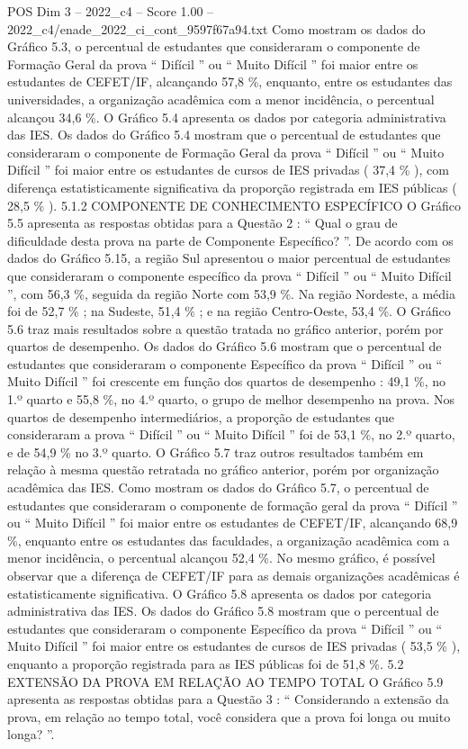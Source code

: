 \begin{textsample}{POS Dim 3 – 2022\_c4 – Score 1.00 – 2022\_c4/enade\_2022\_ci\_cont\_9597f67a94.txt}
Como mostram os dados do Gráfico 5.3, o percentual de estudantes que consideraram o componente de Formação Geral da prova “ Difícil ” ou “ Muito Difícil ” foi maior entre os estudantes de CEFET/IF, alcançando 57,8 \%, enquanto, entre os estudantes das universidades, a organização acadêmica com a menor incidência, o percentual alcançou 34,6 \%.
O Gráfico 5.4 apresenta os dados por categoria administrativa das IES.
Os dados do Gráfico 5.4 mostram que o percentual de estudantes que consideraram o componente de Formação Geral da prova “ Difícil ” ou “ Muito Difícil ” foi maior entre os estudantes de cursos de IES privadas ( 37,4 \% ), com diferença estatisticamente significativa da proporção registrada em IES públicas ( 28,5 \% ). 5.1.2 COMPONENTE DE CONHECIMENTO ESPECÍFICO O Gráfico 5.5 apresenta as respostas obtidas para a Questão 2 : “ Qual o grau de dificuldade desta prova na parte de Componente Específico? ”.
De acordo com os dados do Gráfico 5.15, a região Sul apresentou o maior percentual de estudantes que consideraram o componente específico da prova “ Difícil ” ou “ Muito Difícil ”, com 56,3 \%, seguida da região Norte com 53,9 \%.
Na região Nordeste, a média foi de 52,7 \% ; na Sudeste, 51,4 \% ; e na região Centro-Oeste, 53,4 \%.
O Gráfico 5.6 traz mais resultados sobre a questão tratada no gráfico anterior, porém por quartos de desempenho.
Os dados do Gráfico 5.6 mostram que o percentual de estudantes que consideraram o componente Específico da prova “ Difícil ” ou “ Muito Difícil ” foi crescente em função dos quartos de desempenho : 49,1 \%, no 1.º quarto e 55,8 \%, no 4.º quarto, o grupo de melhor desempenho na prova.
Nos quartos de desempenho intermediários, a proporção de estudantes que consideraram a prova “ Difícil ” ou “ Muito Difícil ” foi de 53,1 \%, no 2.º quarto, e de 54,9 \% no 3.º quarto.
O Gráfico 5.7 traz outros resultados também em relação à mesma questão retratada no gráfico anterior, porém por organização acadêmica das IES.
Como mostram os dados do Gráfico 5.7, o percentual de estudantes que consideraram o componente de formação geral da prova “ Difícil ” ou “ Muito Difícil ” foi maior entre os estudantes de CEFET/IF, alcançando 68,9 \%, enquanto entre os estudantes das faculdades, a organização acadêmica com a menor incidência, o percentual alcançou 52,4 \%.
No mesmo gráfico, é possível observar que a diferença de CEFET/IF para as demais organizações acadêmicas é estatisticamente significativa.
O Gráfico 5.8 apresenta os dados por categoria administrativa das IES.
Os dados do Gráfico 5.8 mostram que o percentual de estudantes que consideraram o componente Específico da prova “ Difícil ” ou “ Muito Difícil ” foi maior entre os estudantes de cursos de IES privadas ( 53,5 \% ), enquanto a proporção registrada para as IES públicas foi de 51,8 \%. 5.2 EXTENSÃO DA PROVA EM RELAÇÃO AO TEMPO TOTAL O Gráfico 5.9 apresenta as respostas obtidas para a Questão 3 : “ Considerando a extensão da prova, em relação ao tempo total, você considera que a prova foi longa ou muito longa? ”.

\end{textsample}
